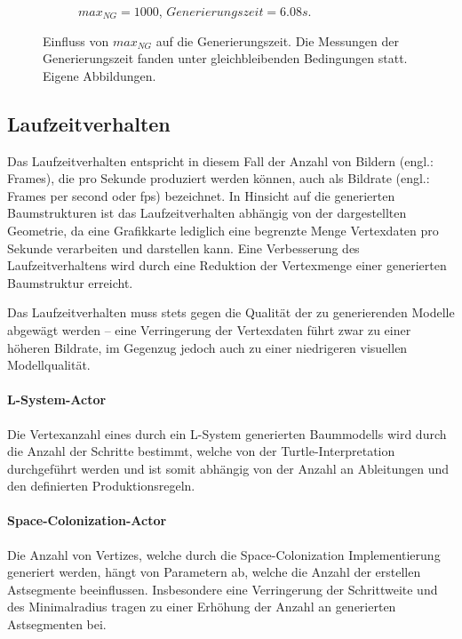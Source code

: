 \begin{figure} [hbtp]
\begin{subfigure}[t]{.45\textwidth}
		\caption{$max_{NG} = 1000$, $Generierungszeit = 6.08 s$.}
		\label{subfig:SCA_maxNG1000}
	\end{subfigure}	
	\caption{Einfluss von $max_{NG}$ auf die Generierungszeit. Die Messungen der Generierungszeit fanden unter gleichbleibenden Bedingungen statt. Eigene Abbildungen.}
	\label{fig:SCA_maxNG}
\end{figure}

\subsection{Laufzeitverhalten}

Das Laufzeitverhalten entspricht in diesem Fall der Anzahl von Bildern (engl.: Frames), die pro Sekunde produziert werden können, auch als Bildrate (engl.: Frames per second oder fps) bezeichnet. In Hinsicht auf die generierten Baumstrukturen ist das Laufzeitverhalten abhängig von der dargestellten Geometrie, da eine Grafikkarte lediglich eine begrenzte Menge Vertexdaten pro Sekunde verarbeiten und darstellen kann. Eine Verbesserung des Laufzeitverhaltens wird durch eine Reduktion der Vertexmenge einer generierten Baumstruktur erreicht.

Das Laufzeitverhalten muss stets gegen die Qualität der zu generierenden Modelle abgewägt werden -- eine Verringerung der Vertexdaten führt zwar zu einer höheren Bildrate, im Gegenzug jedoch auch zu einer niedrigeren visuellen Modellqualität. \cite[S.5]{Deussen:05}

\paragraph{L-System-Actor}

Die Vertexanzahl eines durch ein L-System generierten Baummodells wird durch die Anzahl der Schritte bestimmt, welche von der Turtle-Interpretation durchgeführt werden und ist somit abhängig von der Anzahl an Ableitungen und den definierten Produktionsregeln. 

\paragraph{Space-Colonization-Actor}

Die Anzahl von Vertizes, welche durch die Space-Colonization Implementierung generiert werden, hängt von Parametern ab, welche die Anzahl der erstellen Astsegmente beeinflussen. Insbesondere eine Verringerung der Schrittweite und des Minimalradius tragen zu einer Erhöhung der Anzahl an generierten Astsegmenten bei.

